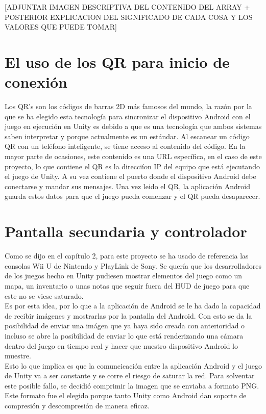 [ADJUNTAR IMAGEN DESCRIPTIVA DEL CONTENIDO DEL ARRAY + POSTERIOR EXPLICACION DEL SIGNIFICADO DE CADA COSA Y LOS VALORES QUE PUEDE TOMAR]

\section{El uso de los QR para inicio de conexi\'on}
\label{cap4:QR}

Los QR's son los c\'odigos de barras 2D m\'as famosos del mundo, la raz\'on por la que se ha elegido esta tecnolog\'ia para sincronizar el dispositivo Android con el juego en ejecuci\'on en Unity es debido a que es una tecnolog\'ia que ambos sistemas saben interpretar y porque actualmente es un est\'andar. Al escanear un c\'odigo QR con un tel\'efono inteligente, se tiene acceso al contenido del c\'odigo. En la mayor parte de ocasiones, este contenido es una URL espec\'ifica, en el caso de este proyecto, lo que contiene el QR es la direcci\'ion IP del equipo que est\'a ejecutando el juego de Unity. A su vez contiene el puerto donde el dispositivo Android debe conectarse y mandar sus mensajes. Una vez leido el QR, la aplicaci\'on Android guarda estos datos para que el juego pueda comenzar y el QR pueda desaparecer. 
\\

\section{Pantalla secundaria y controlador}
\label{cap4:pantallasecundaria}

Como se dijo en el cap\'itulo 2, para este proyecto se ha usado de referencia las consolas Wii U de Nintendo y PlayLink de Sony. Se quer\'ia que los desarrolladores de los juegos hecho en Unity pudiesen mostrar elementos del juego como un mapa, un inventario o unas notas que seguir fuera del HUD de juego para que este no se viese saturado.
\\
Es por esta idea, por lo que a la aplicaci\'on de Android se le ha dado la capacidad de recibir im\'agenes y mostrarlas por la pantalla del Android. Con esto se da la posibilidad de enviar una im\'agen que ya haya sido creada con anterioridad o incluso se abre la posibilidad de enviar lo que est\'a renderizando una c\'amara dentro del juego en tiempo real y hacer que nuestro dispositivo Android lo muestre. 
\\
Esto lo que implica es que la comuncicaci\'on entre la aplicaci\'on Android y el juego de Unity va a ser constante y se corre el riesgo de saturar la red. Para solventar este posible fallo, se decidi\'o comprimir la imagen que se enviaba a formato PNG. Este formato fue el elegido porque tanto Unity como Android dan soporte de compresi\'on y descompresi\'on de manera eficaz. 



